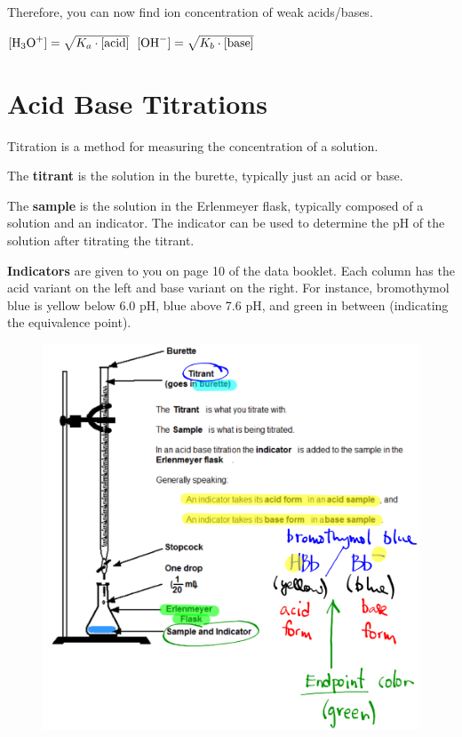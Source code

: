 \documentclass[a4paper,12pt]{article}
\begin{document}
Therefore, you can now find ion concentration of weak acids/bases.

\begin{center}
\Large
$[\ce{H3O+}] = \sqrt{K_a \cdot [\textrm{acid}]}$
\hspace{0.5in}
$[\ce{OH-}] = \sqrt{K_b \cdot [\textrm{base}]}$
\normalsize
\end{center}

\pagebreak

\section{Acid Base Titrations}

Titration is a method for measuring the concentration of a solution.

The \textbf{titrant} is the solution in the burette, typically just an acid or base.

The \textbf{sample} is the solution in the Erlenmeyer flask, typically composed of a solution and an indicator. The indicator can be used to determine the pH of the solution after titrating the titrant.

\textbf{Indicators} are given to you on page 10 of the data booklet. Each column has the acid variant on the left and base variant on the right. For instance, bromothymol blue is yellow below 6.0 pH, blue above 7.6 pH, and green in between (indicating the equivalence point).

\begin{figure}[H]
    \includegraphics[width=\textwidth]{titration}
\end{figure}
\end{document}
